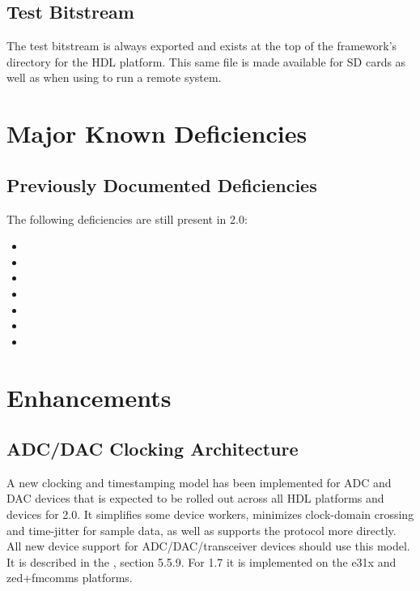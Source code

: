 \subsection{Test Bitstream }
\label{sec:20_testbias}
The test bitstream  is always exported and exists at the top of the framework's directory for the HDL platform. This same file is made available for SD cards as well as when using  to run a remote system.

\section{Major Known Deficiencies}
\label{sec:20_bugs}

\subsection{Previously Documented Deficiencies}
The following deficiencies are still present in 2.0:
\begin{itemize}
\setlength\itemsep{0em} %
\item {}
\item {}
\item {}
\item {}
\item {}
\item {}
\item {}
\end{itemize}


\beginoldnotes
{}
\def\ocpiversion{v1.7.0}
\section{Enhancements}
\subsection{ADC/DAC Clocking Architecture}
\label{sec:17_adc_dac}
A new clocking and timestamping model has been implemented for ADC and DAC devices that is expected to be rolled out across all HDL platforms and devices for 2.0.  It simplifies some device workers, minimizes clock-domain crossing and time-jitter for sample data, as well as supports the  protocol more directly. All new device support for ADC/DAC/transceiver devices should use this model.  It is described in the , section 5.5.9.  For 1.7 it is implemented on the e31x and zed+fmcomms platforms.

